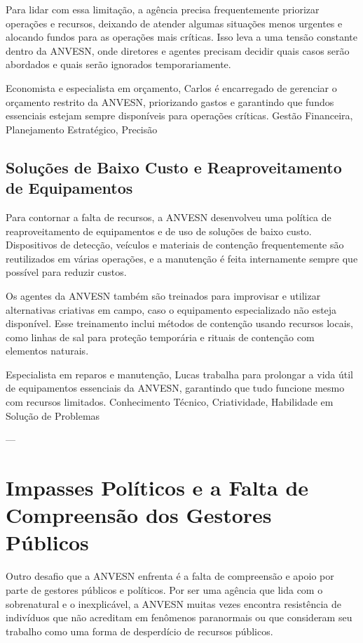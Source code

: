 Para lidar com essa limitação, a agência precisa frequentemente priorizar operações e recursos, deixando de atender algumas situações menos urgentes e alocando fundos para as operações mais críticas. Isso leva a uma tensão constante dentro da ANVESN, onde diretores e agentes precisam decidir quais casos serão abordados e quais serão ignorados temporariamente.

{Economista e especialista em orçamento, Carlos é encarregado de gerenciar o orçamento restrito da ANVESN, priorizando gastos e garantindo que fundos essenciais estejam sempre disponíveis para operações críticas.}
{Gestão Financeira, Planejamento Estratégico, Precisão}

\subsection{Soluções de Baixo Custo e Reaproveitamento de Equipamentos}
Para contornar a falta de recursos, a ANVESN desenvolveu uma política de reaproveitamento de equipamentos e de uso de soluções de baixo custo. Dispositivos de detecção, veículos e materiais de contenção frequentemente são reutilizados em várias operações, e a manutenção é feita internamente sempre que possível para reduzir custos. 

Os agentes da ANVESN também são treinados para improvisar e utilizar alternativas criativas em campo, caso o equipamento especializado não esteja disponível. Esse treinamento inclui métodos de contenção usando recursos locais, como linhas de sal para proteção temporária e rituais de contenção com elementos naturais.

{Especialista em reparos e manutenção, Lucas trabalha para prolongar a vida útil de equipamentos essenciais da ANVESN, garantindo que tudo funcione mesmo com recursos limitados.}
{Conhecimento Técnico, Criatividade, Habilidade em Solução de Problemas}

---

\section{Impasses Políticos e a Falta de Compreensão dos Gestores Públicos}
Outro desafio que a ANVESN enfrenta é a falta de compreensão e apoio por parte de gestores públicos e políticos. Por ser uma agência que lida com o sobrenatural e o inexplicável, a ANVESN muitas vezes encontra resistência de indivíduos que não acreditam em fenômenos paranormais ou que consideram seu trabalho como uma forma de desperdício de recursos públicos.

